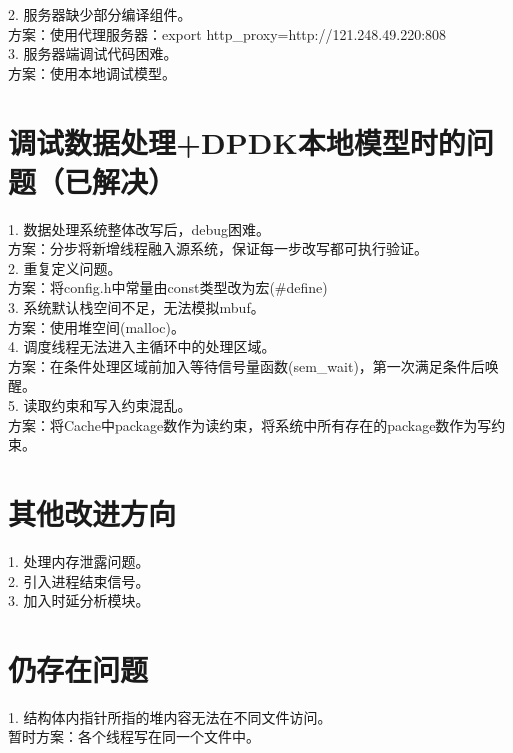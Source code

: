 \documentclass{article}
\begin{document}
2. 服务器缺少部分编译组件。\\
方案：使用代理服务器：export http\_proxy=http://121.248.49.220:808\\

3. 服务器端调试代码困难。\\
方案：使用本地调试模型。\\

\section{调试数据处理+DPDK本地模型时的问题（已解决）}
1. 数据处理系统整体改写后，debug困难。\\
方案：分步将新增线程融入源系统，保证每一步改写都可执行验证。\\

2. 重复定义问题。\\
方案：将config.h中常量由const类型改为宏(\#define)\\

3. 系统默认栈空间不足，无法模拟mbuf。\\
方案：使用堆空间(malloc)。\\

4. 调度线程无法进入主循环中的处理区域。\\
方案：在条件处理区域前加入等待信号量函数(sem\_wait)，第一次满足条件后唤醒。\\

5. 读取约束和写入约束混乱。\\
方案：将Cache中package数作为读约束，将系统中所有存在的package数作为写约束。\\

\section{其他改进方向}
1. 处理内存泄露问题。\\

2. 引入进程结束信号。\\

3. 加入时延分析模块。\\

\section{仍存在问题}
1. 结构体内指针所指的堆内容无法在不同文件访问。\\
暂时方案：各个线程写在同一个文件中。\\
\end{document}
